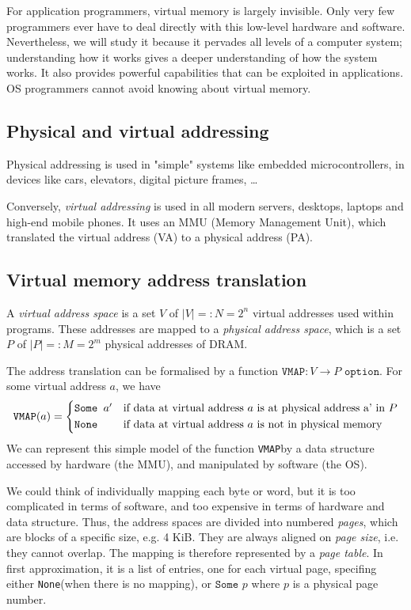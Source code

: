 \documentclass[toc]{../cs-classes/cs-classes}
\newcommand*{\option}{\texttt{ option}}
\newcommand*{\none}{\texttt{None}}
\newcommand*{\some}{\texttt{Some }}
\newcommand*{\vmap}{\texttt{VMAP}}
\begin{document}
For application programmers, virtual memory is largely invisible. Only very few programmers ever have to deal directly with this low-level hardware and software. Nevertheless, we will study it because it pervades all levels of a computer system; understanding how it works gives a deeper understanding of how the system works. It also provides powerful capabilities that can be exploited in applications. OS programmers cannot avoid knowing about virtual memory.

\subsection{Physical and virtual addressing}
Physical addressing is used in "simple" systems like embedded microcontrollers, in devices like cars, elevators, digital picture frames, \dots

Conversely, \emph{virtual addressing} is used in all modern servers, desktops, laptops and high-end mobile phones. It uses an MMU (Memory Management Unit), which translated the virtual address (VA) to a physical address (PA).

\subsection{Virtual memory address translation}
A \emph{virtual address space} is a set $V$ of $|V|=:N=2^n$ virtual addresses used within programs. These addresses are mapped to a \emph{physical address space}, which is a set $P$ of $|P|=:M=2^m$ physical addresses of DRAM.

The address translation can be formalised by a function $\vmap:V\to P \option$. For some virtual address $a$, we have
\begin{equation*}
    \vmap(a) = \begin{cases*}
        \some a' & if data at virtual address $a$ is at physical address a' in $P$\\
        \none & if data at virtual address $a$ is not in physical memory
    \end{cases*}
\end{equation*}
We can represent this simple model of the function \vmap by a data structure accessed by hardware (the MMU), and manipulated by software (the OS). 

We could think of individually mapping each byte or word, but it is too complicated in terms of software, and too expensive in terms of hardware and data structure. Thus, the address spaces are divided into numbered \emph{pages}, which are blocks of a specific size, e.g. 4 KiB. They are always aligned on \emph{page size}, i.e. they cannot overlap. The mapping is therefore represented by a \emph{page table}. In first approximation, it is a list of entries, one for each virtual page, specifing either \none (when there is no mapping), or $\some p$ where $p$ is a physical page number.
\end{document}
